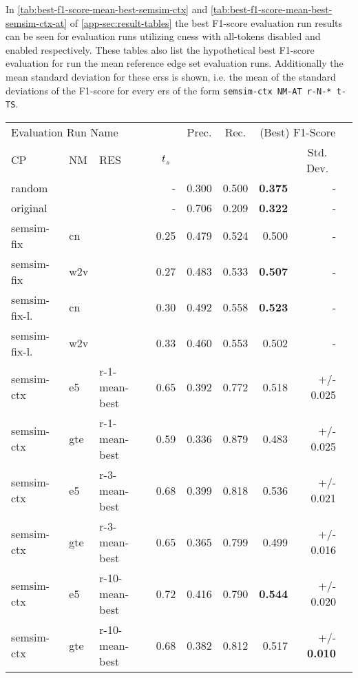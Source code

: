 \documentclass[11pt, numbers=noenddot]{scrreprt}
\begin{document}
In \cref{tab:best-f1-score-mean-best-semsim-ctx} and \cref{tab:best-f1-score-mean-best-semsim-ctx-at} of \cref{app-sec:result-tables} the best F1-score evaluation run results can be seen for evaluation runs utilizing \gls{cness} with all-tokens disabled and enabled respectively. These tables also list the hypothetical best F1-score evaluation for run the mean reference edge set evaluation runs. Additionally the mean standard deviation for these \gls{ers}s is shown, i.e. the mean of the standard deviations of the F1-score for every \gls{ers} of the form \texttt{semsim-ctx NM-AT r-N-* t-TS}.

\begin{table}[htp]
\centering
\begin{tabular}{lllrrrrrr}
\toprule
\multicolumn{4}{l}{Evaluation Run Name} & \multicolumn{1}{c}{Prec.} & \multicolumn{1}{c}{Rec.} & \multicolumn{2}{c}{(Best) F1-Score}\\
\cmidrule{1-4}\cmidrule{7-8}
\multicolumn{1}{l}{CP} & \multicolumn{1}{l}{NM} & \multicolumn{1}{l}{RES} & \multicolumn{1}{c}{\(t_s\)} & \multicolumn{3}{l}{} & \multicolumn{1}{c}{Std. Dev.} \\
\midrule
random &  &  & - & 0.300 & 0.500 & \textbf{0.375} & - \\
\hline
original &  &  & - & 0.706 & 0.209 & \textbf{0.322} & - \\
\hline
semsim-fix & cn &  & 0.25 & 0.479 & 0.524 & 0.500 & - \\
semsim-fix & w2v &  & 0.27 & 0.483 & 0.533 & \textbf{0.507} & - \\
\hline
semsim-fix-l. & cn &  & 0.30 & 0.492 & 0.558 & \textbf{0.523} & - \\
semsim-fix-l. & w2v &  & 0.33 & 0.460 & 0.553 & 0.502 & - \\
\hline
semsim-ctx & e5 & r-1-mean-best & 0.65 & 0.392 & 0.772 & 0.518 & +/- 0.025 \\
semsim-ctx & gte & r-1-mean-best & 0.59 & 0.336 & 0.879 & 0.483 & +/- 0.025 \\
semsim-ctx & e5 & r-3-mean-best & 0.68 & 0.399 & 0.818 & 0.536 & +/- 0.021 \\
semsim-ctx & gte & r-3-mean-best & 0.65 & 0.365 & 0.799 & 0.499 & +/- 0.016 \\
semsim-ctx & e5 & r-10-mean-best & 0.72 & 0.416 & 0.790 & \textbf{0.544} & +/- 0.020 \\
semsim-ctx & gte & r-10-mean-best & 0.68 & 0.382 & 0.812 & 0.517 & +/- \textbf{0.010} \\


\end{tabular}
\end{table}
\end{document}
